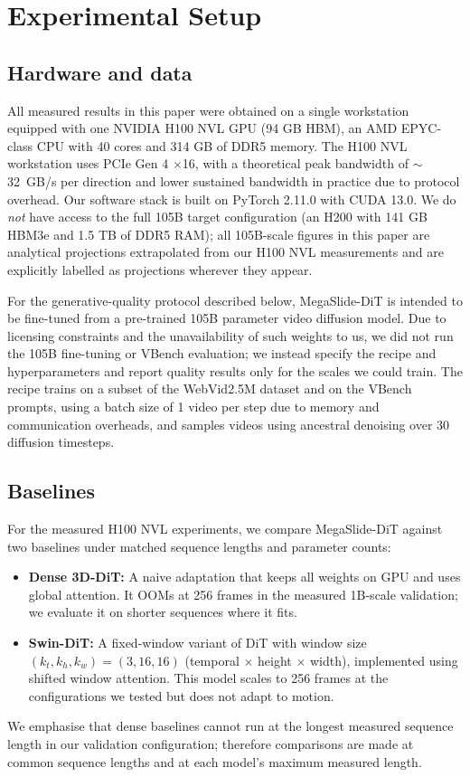 \documentclass[11pt, letterpaper]{article}
\begin{document}
\section{Experimental Setup}

\subsection{Hardware and data}
All measured results in this paper were obtained on a single workstation equipped with one NVIDIA H100 NVL GPU (94 GB HBM), an AMD EPYC-class CPU with 40 cores and 314 GB of DDR5 memory. The H100 NVL workstation uses PCIe Gen 4 $\times$16, with a theoretical peak bandwidth of $\sim$32~GB/s per direction and lower sustained bandwidth in practice due to protocol overhead. Our software stack is built on PyTorch 2.11.0 with CUDA 13.0. We do \emph{not} have access to the full 105B target configuration (an H200 with 141 GB HBM3e and 1.5 TB of DDR5 RAM); all 105B-scale figures in this paper are analytical projections extrapolated from our H100 NVL measurements and are explicitly labelled as projections wherever they appear.

For the generative-quality protocol described below, MegaSlide-DiT is intended to be fine-tuned from a pre-trained 105B parameter video diffusion model. Due to licensing constraints and the unavailability of such weights to us, we did not run the 105B fine-tuning or VBench evaluation; we instead specify the recipe and hyperparameters and report quality results only for the scales we could train. The recipe trains on a subset of the WebVid2.5M dataset and on the VBench prompts, using a batch size of 1 video per step due to memory and communication overheads, and samples videos using ancestral denoising over 30 diffusion timesteps.

\subsection{Baselines}
For the measured H100 NVL experiments, we compare MegaSlide-DiT against two baselines under matched sequence lengths and parameter counts:
\begin{itemize}
    \item \textbf{Dense 3D-DiT:} A naive adaptation that keeps all weights on GPU and uses global attention. It OOMs at 256 frames in the measured 1B-scale validation; we evaluate it on shorter sequences where it fits.
    \item \textbf{Swin-DiT:} A fixed-window variant of DiT with window size $(k_t, k_h, k_w) = (3, 16, 16)$ (temporal $\times$ height $\times$ width), implemented using shifted window attention. This model scales to 256 frames at the configurations we tested but does not adapt to motion.
\end{itemize}
We emphasise that dense baselines cannot run at the longest measured sequence length in our validation configuration; therefore comparisons are made at common sequence lengths and at each model’s maximum measured length.
\end{document}
